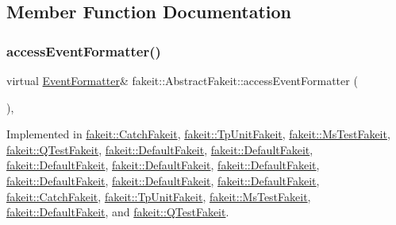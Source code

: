 \subsection{Member Function Documentation}
\mbox{\label{classfakeit_1_1AbstractFakeit_a443a7ac12208c55f2ae4fa072e983476}} 
\subsubsection{\texorpdfstring{accessEventFormatter()}{accessEventFormatter()}\hspace{0.1cm}{\footnotesize\ttfamily [1/9]}}
{\footnotesize\ttfamily virtual \mbox{\hyperlink{structfakeit_1_1EventFormatter}{Event\+Formatter}}\& fakeit\+::\+Abstract\+Fakeit\+::access\+Event\+Formatter (\begin{DoxyParamCaption}{ }\end{DoxyParamCaption})\hspace{0.3cm}{\ttfamily [protected]}, {}}



Implemented in \mbox{\hyperlink{classfakeit_1_1CatchFakeit_aaadf534923d2255186e3a13446828b05}{fakeit\+::\+Catch\+Fakeit}}, \mbox{\hyperlink{classfakeit_1_1TpUnitFakeit_ae0f3713842b30e36ee1b0ce03a070b59}{fakeit\+::\+Tp\+Unit\+Fakeit}}, \mbox{\hyperlink{classfakeit_1_1MsTestFakeit_ad4e89ab859aa132a1f35fc0fea7d05a2}{fakeit\+::\+Ms\+Test\+Fakeit}}, \mbox{\hyperlink{classfakeit_1_1QTestFakeit_a3760d57c61ed1572bcf5cded00f643ec}{fakeit\+::\+Q\+Test\+Fakeit}}, \mbox{\hyperlink{classfakeit_1_1DefaultFakeit_a02cb8f08a94e7bf830c87f74f20c9bd9}{fakeit\+::\+Default\+Fakeit}}, \mbox{\hyperlink{classfakeit_1_1DefaultFakeit_a02cb8f08a94e7bf830c87f74f20c9bd9}{fakeit\+::\+Default\+Fakeit}}, \mbox{\hyperlink{classfakeit_1_1DefaultFakeit_a02cb8f08a94e7bf830c87f74f20c9bd9}{fakeit\+::\+Default\+Fakeit}}, \mbox{\hyperlink{classfakeit_1_1DefaultFakeit_a02cb8f08a94e7bf830c87f74f20c9bd9}{fakeit\+::\+Default\+Fakeit}}, \mbox{\hyperlink{classfakeit_1_1DefaultFakeit_a02cb8f08a94e7bf830c87f74f20c9bd9}{fakeit\+::\+Default\+Fakeit}}, \mbox{\hyperlink{classfakeit_1_1DefaultFakeit_a02cb8f08a94e7bf830c87f74f20c9bd9}{fakeit\+::\+Default\+Fakeit}}, \mbox{\hyperlink{classfakeit_1_1DefaultFakeit_a02cb8f08a94e7bf830c87f74f20c9bd9}{fakeit\+::\+Default\+Fakeit}}, \mbox{\hyperlink{classfakeit_1_1DefaultFakeit_a02cb8f08a94e7bf830c87f74f20c9bd9}{fakeit\+::\+Default\+Fakeit}}, \mbox{\hyperlink{classfakeit_1_1CatchFakeit_aaadf534923d2255186e3a13446828b05}{fakeit\+::\+Catch\+Fakeit}}, \mbox{\hyperlink{classfakeit_1_1TpUnitFakeit_ae0f3713842b30e36ee1b0ce03a070b59}{fakeit\+::\+Tp\+Unit\+Fakeit}}, \mbox{\hyperlink{classfakeit_1_1MsTestFakeit_ad4e89ab859aa132a1f35fc0fea7d05a2}{fakeit\+::\+Ms\+Test\+Fakeit}}, \mbox{\hyperlink{classfakeit_1_1DefaultFakeit_a02cb8f08a94e7bf830c87f74f20c9bd9}{fakeit\+::\+Default\+Fakeit}}, and \mbox{\hyperlink{classfakeit_1_1QTestFakeit_a3760d57c61ed1572bcf5cded00f643ec}{fakeit\+::\+Q\+Test\+Fakeit}}.

